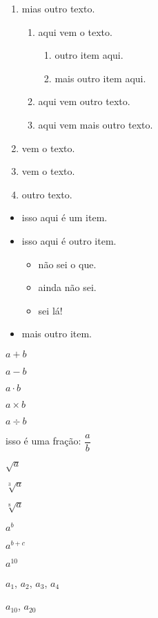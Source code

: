 \documentclass[a4paper, 12pt]{article}
\begin{document}
 \begin{enumerate}
  \item mias outro texto.
  \begin{enumerate}
   \item aqui vem o texto.
   \begin{enumerate}
    \item outro item aqui.
    \item mais outro item aqui.
   \end{enumerate}      
   
   \item aqui vem outro texto.
   \item aqui vem mais outro texto.  
  \end{enumerate}
  
  \item vem o texto.
  \item vem o texto.
  \item outro texto.
 \end{enumerate}
 
 \begin{itemize}
  \item isso aqui é um item.
  \item isso aqui é outro item.
   \begin{itemize}
    \item não sei o que.
    \item ainda não sei.
    \item sei lá!
   \end{itemize}
  
  \item mais outro item.
 \end{itemize}
 
$a + b$

$a - b$

$a\cdot b$

$a\times b$

$a \div b$

isso é uma fração: $\dfrac{a}{b}$

$\sqrt{a}$

$\sqrt[3]{a}$

$\sqrt[8]{a}$

$a^b$

$a^{b+c}$

$a^{10}$
 
$a_1$, $a_2$, $a_3$, $a_4$

$a_{10}$, $a_{20}$
 
\end{document}
